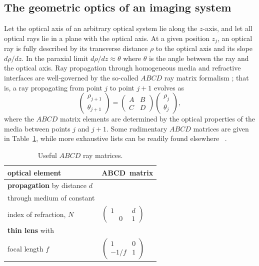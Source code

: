 \subsection{The geometric optics of an imaging system}
Let the optical axis of an arbitrary optical system lie along the $z$-axis,
and let all optical rays lie in a plane with the optical axis.
At a given position $z_j$, an optical ray is fully described by
its transverse distance $\rho$ to the optical axis and
its slope $d\rho / dz$.
In the paraxial limit $d\rho / dz \approx \theta$
where $\theta$ is the angle between the ray and the optical axis.
Ray propagation through homogeneous media and refractive interfaces
are well-governed by the so-called $ABCD$ ray matrix formalism
\cite[Ch.~15]{siegman_lasers};
that is, a ray propagating from point $j$ to point $j + 1$ evolves as
\begin{equation}
  \begin{pmatrix}
    \rho_{j + 1}
    \\
    \theta_{j + 1}
  \end{pmatrix}
  =
  \begin{pmatrix}
    A & B
    \\
    C & D
  \end{pmatrix}
  \begin{pmatrix}
    \rho_j
    \\
    \theta_j
  \end{pmatrix},
  \label{eq:InterferometricMethods:ABCD_ray_tracing_general}
\end{equation}
where the $ABCD$ matrix elements are determined
by the optical properties of the media between points $j$ and $j + 1$.
Some rudimentary $ABCD$ matrices are given in
Table~\ref{table:InterferometricMethods:ABCD_matrices}, while
more exhaustive lists can be readily found elsewhere
\cite[Ch.~15]{siegman_lasers}~\cite{tovar_generalized_beam_matrices_IV}.

\begin{table}
  \centering
  \renewcommand{\arraystretch}{1.5}%
  \begin{tabular}{%
    >{\centering}m{6cm} >{\centering}m{4.5cm}
  }
    \toprule%
    \textbf{optical element} & $\mathbf{ABCD}$~\textbf{matrix}
    \tabularnewline%
    \midrule
    \textbf{propagation} by distance $d$ \\
    through medium of constant \\
    index of refraction, $N$
    &
    $\begin{pmatrix}
      1 & d
      \\
      \phantom{-} 0 \phantom{f} & 1  %
    \end{pmatrix}$
    \tabularnewline%
    \textbf{thin lens} with \\
    focal length $f$
    &
    $\begin{pmatrix}
      1 & 0
      \\
      -1/f & 1
    \end{pmatrix}$
    \tabularnewline%
    \toprule%
  \end{tabular}
  \caption[Useful $ABCD$ ray matrices]{Useful $ABCD$ ray matrices.}
\label{table:InterferometricMethods:ABCD_matrices}
\end{table}

